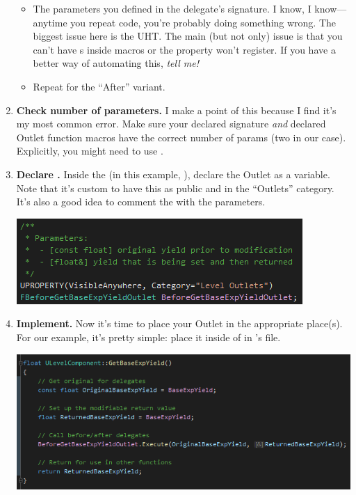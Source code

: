 \begin{enumerate}
{\begin{itemize}
{\begin{tcolorbox}[colback=gray!20!white,colframe=blue!75!black,title=Priorities]
	 \end{tcolorbox}\vspace*{12pt}
			}
			\item{The parameters you defined in the delegate's signature. I know, I know---anytime you repeat code, you're probably doing something wrong. The biggest issue here is the UHT. The main (but not only) issue is that you can't have s inside macros or the property won't register. If you have a better way of automating this, \textit{tell me!}}
			\item{Repeat for the ``After'' variant.}
		\end{itemize}
	}
	\item{\textbf{Check number of parameters.} I make a point of this because I find it's my most common error. Make sure your declared signature \textit{and} declared Outlet function macros have the correct number of params (two in our case). Explicitly, you might need to use .}
	\item{\textbf{Declare .} Inside the  (in this example, ), declare the Outlet as a variable. Note that it's custom to have this  as public and in the ``Outlets'' category. It's also a good idea to comment the  with the parameters.
	\begin{center}
		\includegraphics[scale=\ScreenshotScale]{create-outlet-uproperty}
	\end{center}
	}
	\item{\textbf{Implement.} Now it's time to place your Outlet in the appropriate place(s). For our example, it's pretty simple: place it inside of  in 's  file.
	\begin{center}
		\includegraphics[scale=\ScreenshotScale]{create-outlet-cpp}

\end{center}}
\end{enumerate}
